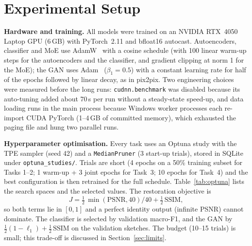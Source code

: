 \documentclass[conference]{IEEEtran}
\begin{document}
\section{Experimental Setup}\label{sec:setup}
\textbf{Hardware and training.} All models were trained on an NVIDIA RTX~4050 Laptop GPU (6\,GB) with PyTorch~2.11
and bfloat16 autocast. Autoencoders, classifier and MoE use AdamW~\cite{loshchilov2019} with a cosine schedule
(with 100 linear warm-up steps for the autoencoders and the classifier, and gradient clipping at norm 1 for the
MoE); the GAN uses Adam~\cite{kingma2015} ($\beta_1=0.5$) with a constant learning rate for half of the
epochs followed by linear decay, as in pix2pix. Two engineering choices were measured before the long runs:
\texttt{cudnn.benchmark} was disabled because its auto-tuning added about 70\,s per run without a steady-state
speed-up, and data loading runs in the main process because Windows worker processes each re-import CUDA PyTorch
(1--4\,GB of committed memory), which exhausted the paging file and hung two parallel runs.

\textbf{Hyperparameter optimisation.} Every task uses an Optuna study with the TPE sampler (seed 42) and a
\texttt{MedianPruner} (3 start-up trials), stored in SQLite under \texttt{optuna\_studies/}. Trials are short
(4 epochs on a 50\% training subset for Tasks 1--2; 1 warm-up + 3 joint epochs for Task~3; 10 epochs for Task~4) and
the best configuration is then retrained for the full schedule. Table~\ref{tab:optuna} lists the search spaces and
the selected values. The restoration objective is
\begin{equation}
J = \tfrac12\,\min(\mathrm{PSNR},40)/40 + \tfrac12\,\mathrm{SSIM},\label{eq:obj}
\end{equation}
so both terms lie in $[0,1]$ and a perfect identity output (infinite PSNR) cannot dominate. The classifier is
selected by validation macro-F1, and the GAN by $\tfrac12(1-\ell_1)+\tfrac12\,\mathrm{SSIM}$ on the validation
sketches. The budget (10--15 trials) is small; this trade-off is discussed in Section~\ref{sec:limits}.
\end{document}
